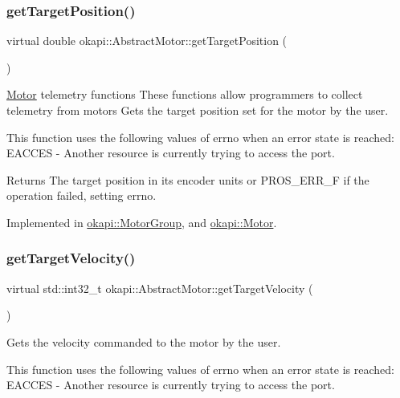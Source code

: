 \subsubsection{\texorpdfstring{getTargetPosition()}{getTargetPosition()}}
{\footnotesize\ttfamily virtual double okapi\+::\+Abstract\+Motor\+::get\+Target\+Position (\begin{DoxyParamCaption}{ }\end{DoxyParamCaption})\hspace{0.3cm}{\ttfamily [pure virtual]}}

\mbox{\hyperlink{classokapi_1_1Motor}{Motor}} telemetry functions These functions allow programmers to collect telemetry from motors Gets the target position set for the motor by the user.

This function uses the following values of errno when an error state is reached\+: E\+A\+C\+C\+ES -\/ Another resource is currently trying to access the port.

\begin{DoxyReturn}{Returns}
The target position in its encoder units or P\+R\+O\+S\+\_\+\+E\+R\+R\+\_\+F if the operation failed, setting errno. 
\end{DoxyReturn}


Implemented in \mbox{\hyperlink{classokapi_1_1MotorGroup_ad6332111f8b2642bc13fbd8822328121}{okapi\+::\+Motor\+Group}}, and \mbox{\hyperlink{classokapi_1_1Motor_af575af2b4d4cf5aea6e8aac50ef1cbbd}{okapi\+::\+Motor}}.

\mbox{\label{classokapi_1_1AbstractMotor_a96b02cca7b51f75c01d2d22aab474fe4}} 
\subsubsection{\texorpdfstring{getTargetVelocity()}{getTargetVelocity()}}
{\footnotesize\ttfamily virtual std\+::int32\+\_\+t okapi\+::\+Abstract\+Motor\+::get\+Target\+Velocity (\begin{DoxyParamCaption}{ }\end{DoxyParamCaption})\hspace{0.3cm}{\ttfamily [pure virtual]}}

Gets the velocity commanded to the motor by the user.

This function uses the following values of errno when an error state is reached\+: E\+A\+C\+C\+ES -\/ Another resource is currently trying to access the port.

